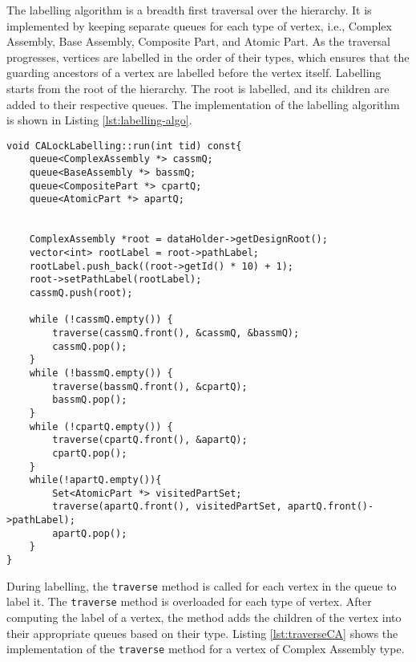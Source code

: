 The labelling algorithm is a breadth first traversal over the hierarchy. It is implemented by keeping separate queues for each type of vertex, i.e., Complex Assembly, Base Assembly, Composite Part, and Atomic Part. As the traversal progresses, vertices are labelled in the order of their types, which ensures that the guarding ancestors of a vertex are labelled before the vertex itself.
Labelling starts from the root of the hierarchy. The root is labelled, and its children are added to their respective queues. The implementation of the labelling algorithm is shown in Listing \ref{lst:labelling-algo}.

\begin{lstlisting}[caption={BFS traversal for CALock labelling}, label={lst:labelling-algo}]
void CALockLabelling::run(int tid) const{
    queue<ComplexAssembly *> cassmQ;
    queue<BaseAssembly *> bassmQ;
    queue<CompositePart *> cpartQ;
    queue<AtomicPart *> apartQ;


    ComplexAssembly *root = dataHolder->getDesignRoot();
    vector<int> rootLabel = root->pathLabel;
    rootLabel.push_back((root->getId() * 10) + 1);
    root->setPathLabel(rootLabel);
    cassmQ.push(root);

    while (!cassmQ.empty()) {
        traverse(cassmQ.front(), &cassmQ, &bassmQ);
        cassmQ.pop();
    }
    while (!bassmQ.empty()) {
        traverse(bassmQ.front(), &cpartQ);
        bassmQ.pop();
    }
    while (!cpartQ.empty()) {
        traverse(cpartQ.front(), &apartQ);
        cpartQ.pop();
    }
    while(!apartQ.empty()){
        Set<AtomicPart *> visitedPartSet;
        traverse(apartQ.front(), visitedPartSet, apartQ.front()->pathLabel);
        apartQ.pop();
    }
}

\end{lstlisting}

During labelling, the \texttt{traverse} method is called for each vertex in the queue to label it. The \texttt{traverse} method is overloaded for each type of vertex. After computing the label of a vertex, the method adds the children of the vertex into their appropriate queues based on their type. Listing \ref{lst:traverseCA} shows the implementation of the \texttt{traverse} method for a vertex of Complex Assembly type.

